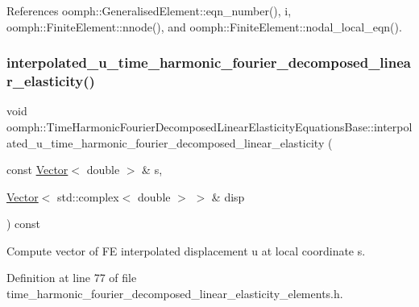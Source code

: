 References oomph\+::\+Generalised\+Element\+::eqn\+\_\+number(), i, oomph\+::\+Finite\+Element\+::nnode(), and oomph\+::\+Finite\+Element\+::nodal\+\_\+local\+\_\+eqn().

\mbox{\label{classoomph_1_1TimeHarmonicFourierDecomposedLinearElasticityEquationsBase_a01357567fa0212ff94370a78ebca67b1}} 
\subsubsection{\texorpdfstring{interpolated\+\_\+u\+\_\+time\+\_\+harmonic\+\_\+fourier\+\_\+decomposed\+\_\+linear\+\_\+elasticity()}{interpolated\_u\_time\_harmonic\_fourier\_decomposed\_linear\_elasticity()}\hspace{0.1cm}{\footnotesize\ttfamily [1/2]}}
{\footnotesize\ttfamily void oomph\+::\+Time\+Harmonic\+Fourier\+Decomposed\+Linear\+Elasticity\+Equations\+Base\+::interpolated\+\_\+u\+\_\+time\+\_\+harmonic\+\_\+fourier\+\_\+decomposed\+\_\+linear\+\_\+elasticity (\begin{DoxyParamCaption}\item[{const \hyperlink{classoomph_1_1Vector}{Vector}$<$ double $>$ \&}]{s,  }\item[{\hyperlink{classoomph_1_1Vector}{Vector}$<$ std\+::complex$<$ double $>$ $>$ \&}]{disp }\end{DoxyParamCaption}) const\hspace{0.3cm}{\ttfamily [inline]}}



Compute vector of FE interpolated displacement u at local coordinate s. 



Definition at line 77 of file time\+\_\+harmonic\+\_\+fourier\+\_\+decomposed\+\_\+linear\+\_\+elasticity\+\_\+elements.\+h.



